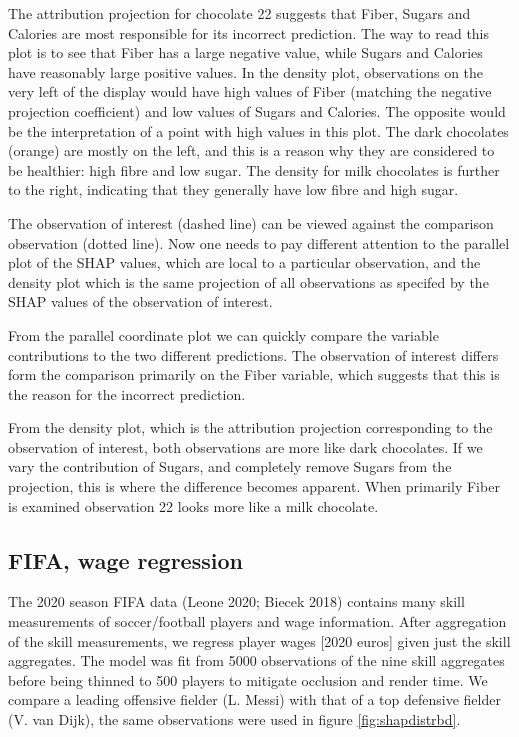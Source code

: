 \documentclass[
]{article}
\begin{document}
The attribution projection for chocolate 22 suggests that Fiber, Sugars and Calories are most responsible for its incorrect prediction. The way to read this plot is to see that Fiber has a large negative value, while Sugars and Calories have reasonably large positive values. In the density plot, observations on the very left of the display would have high values of Fiber (matching the negative projection coefficient) and low values of Sugars and Calories. The opposite would be the interpretation of a point with high values in this plot. The dark chocolates (orange) are mostly on the left, and this is a reason why they are considered to be healthier: high fibre and low sugar. The density for milk chocolates is further to the right, indicating that they generally have low fibre and high sugar.

The observation of interest (dashed line) can be viewed against the comparison observation (dotted line). Now one needs to pay different attention to the parallel plot of the SHAP values, which are local to a particular observation, and the density plot which is the same projection of all observations as specifed by the SHAP values of the observation of interest.

From the parallel coordinate plot we can quickly compare the variable contributions to the two different predictions. The observation of interest differs form the comparison primarily on the Fiber variable, which suggests that this is the reason for the incorrect prediction.

From the density plot, which is the attribution projection corresponding to the observation of interest, both observations are more like dark chocolates. If we vary the contribution of Sugars, and completely remove Sugars from the projection, this is where the difference becomes apparent. When primarily Fiber is examined observation 22 looks more like a milk chocolate.

\hypertarget{fifa-wage-regression}{%
\subsection{FIFA, wage regression}\label{fifa-wage-regression}}

The 2020 season FIFA data (Leone 2020; Biecek 2018) contains many skill measurements of soccer/football players and wage information. After aggregation of the skill measurements, we regress player wages {[}2020 euros{]} given just the skill aggregates. The model was fit from 5000 observations of the nine skill aggregates before being thinned to 500 players to mitigate occlusion and render time. We compare a leading offensive fielder (L. Messi) with that of a top defensive fielder (V. van Dijk), the same observations were used in figure \ref{fig:shapdistrbd}.
\end{document}
